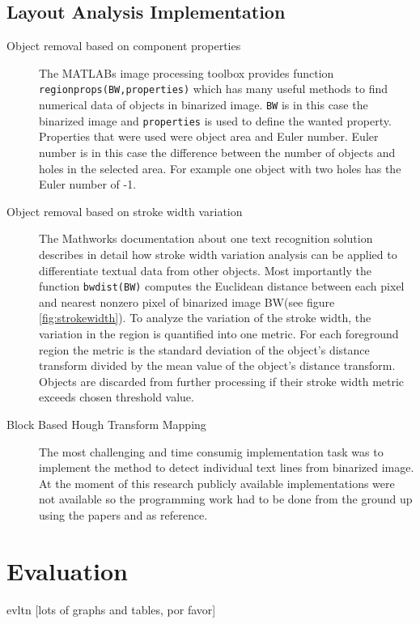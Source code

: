 \documentclass{article}
\def\code#1{\texttt{#1}}
\begin{document}
        \subsection{Layout Analysis Implementation}
          \begin{description}
            \item [Object removal based on component properties] The MATLABs image processing toolbox  provides function \code{regionprops(BW,properties)} which has many useful methods to find numerical data of objects in binarized image. \code{BW} is in this case the binarized image and \code{properties} is used to define the wanted property. Properties that were used were object area and Euler number. Euler number is in this case the difference between the number of objects and holes in the selected area. For example one object with two holes has the Euler number of -1.
            \item [Object removal based on stroke width variation] The Mathworks documentation about one text recognition solution describes in detail how stroke width variation analysis can be applied to differentiate textual data from other objects. \cite{MathworksTextRecognition} Most importantly the function \code{bwdist(BW)} computes the Euclidean distance between each pixel and nearest nonzero pixel of binarized image BW(see figure \ref{fig:strokewidth}). To analyze the variation of the stroke width, the variation in the region is quantified into one metric. For each foreground region the metric is the standard deviation of the object's distance transform divided by the mean value of the object's distance transform. Objects are discarded from further processing if their stroke width metric exceeds chosen threshold value.
            \item [Block Based Hough Transform Mapping] The most challenging and time consumig implementation task was to implement the method to detect individual text lines from binarized image. At the moment of this research publicly available implementations were not available so the programming work had to be done from the ground up using the papers \cite{Louloudis1} and \cite{Louloudis2} as reference.
          \end{description}

  \newpage
  \section{Evaluation}
    evltn [lots of graphs and tables, por favor]
\end{document}
